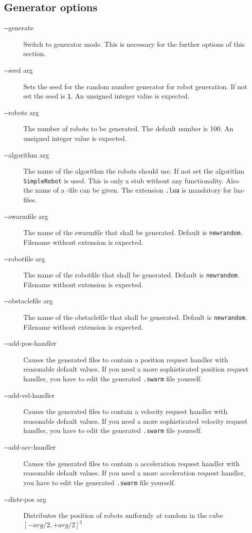 \documentclass[a4paper,halfparskip,11pt,twoside]{scrartcl}
\begin{document}
\subsection{Generator options}
\begin{description}
	\item [-{}-generate] Switch to generator mode. This is necessary for the further options of this section.
	\item [-{}-seed arg] Sets the seed for the random number generator for robot generation. If not set the seed is {\tt 1}. An unsigned integer value is expected.
	\item [-{}-robots arg] The number of robots to be generated. The default number is 100. An unsigned integer value is expected.
	\item [-{}-algorithm arg] The name of the algorithm the robots should use. If not set the algorithm {\tt SimpleRobot} is used. This is only a stub without any functionality. Also the name of a \Lua-file can be given. The extension {\tt .lua} is mandatory for lua-files.
	\item [-{}-swarmfile arg] The name of the swarmfile that shall be generated. Default is {\tt newrandom}. Filename without extension is expected.
	\item [-{}-robotfile arg] The name of the robotfile that shall be generated. Default is {\tt newrandom}. Filename without extension is expected.
	\item [-{}-obstaclefile arg] The name of the obstaclefile that shall be generated. Default is {\tt newrandom}. Filename without extension is expected.
	\item [-{}-add-pos-handler] Causes the generated files to contain a position request handler with reasonable default values. If you need a more sophisticated position request handler, you have to edit the generated {\tt .swarm} file yourself.
	\item [-{}-add-vel-handler] Causes the generated files to contain a velocity request handler with reasonable default values. If you need a more sophisticated velocity request handler, you have to edit the generated {\tt .swarm} file yourself.
	\item [-{}-add-acc-handler] Causes the generated files to contain a acceleration request handler with reasonable default values. If you need a more acceleration request handler, you have to edit the generated {\tt .swarm} file yourself.
	\item [-{}-distr-pos arg] Distributes the position of robots uniformly at random in the cube $[-arg/2,+arg/2]^3$

\end{description}
\end{document}
